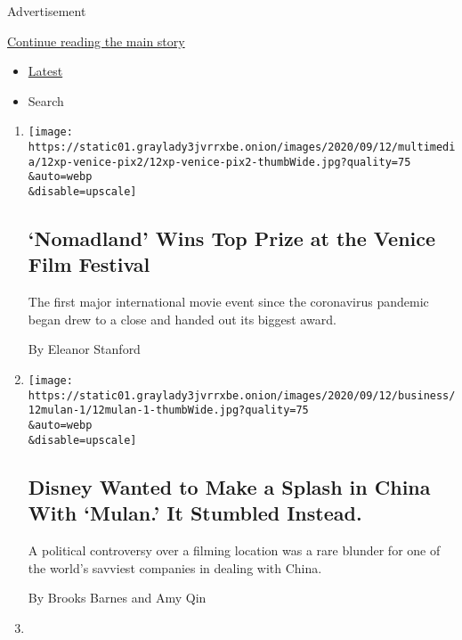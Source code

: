 Advertisement

\protect\hyperlink{after-mid1}{Continue reading the main story}

\begin{itemize}
\tightlist
\item
  \protect\hyperlink{stream-panel}{Latest}
\item
  Search
\end{itemize}

\begin{enumerate}
\def\labelenumi{\arabic{enumi}.}
\item
  \href{/2020/09/12/movies/nomadland-venice-film-festival.html}{}

  \texttt{[image: https://static01.graylady3jvrrxbe.onion/images/2020/09/12/multimedia/12xp-venice-pix2/12xp-venice-pix2-thumbWide.jpg?quality=75\\\&auto=webp\\\&disable=upscale]}

  \hypertarget{nomadland-wins-top-prize-at-the-venice-film-festival}{%
  \subsection{`Nomadland' Wins Top Prize at the Venice Film
  Festival}\label{nomadland-wins-top-prize-at-the-venice-film-festival}}

  The first major international movie event since the coronavirus
  pandemic began drew to a close and handed out its biggest award.

  By Eleanor Stanford
\item
  \href{/2020/09/12/business/media/disney-mulan-china.html}{}

  \texttt{[image: https://static01.graylady3jvrrxbe.onion/images/2020/09/12/business/12mulan-1/12mulan-1-thumbWide.jpg?quality=75\\\&auto=webp\\\&disable=upscale]}

  \hypertarget{disney-wanted-to-make-a-splash-in-china-with-mulan-it-stumbled-instead}{%
  \subsection{Disney Wanted to Make a Splash in China With `Mulan.' It
  Stumbled
  Instead.}\label{disney-wanted-to-make-a-splash-in-china-with-mulan-it-stumbled-instead}}

  A political controversy over a filming location was a rare blunder for
  one of the world's savviest companies in dealing with China.

  By Brooks Barnes and Amy Qin
\item
  \href{/2020/09/12/arts/music/simeon-coxe-dead.html}{}


\end{enumerate}
